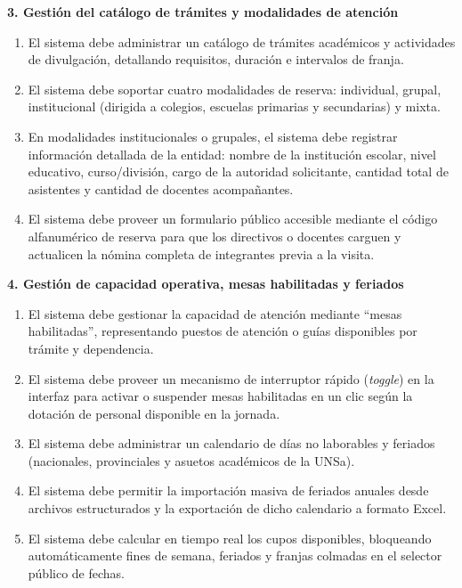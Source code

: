 \textbf{3. Gestión del catálogo de trámites y modalidades de atención}
\begin{enumerate}[resume]
    \item El sistema debe administrar un catálogo de trámites académicos y actividades de divulgación, detallando requisitos, duración e intervalos de franja.
    \item El sistema debe soportar cuatro modalidades de reserva: individual, grupal, institucional (dirigida a colegios, escuelas primarias y secundarias) y mixta.
    \item En modalidades institucionales o grupales, el sistema debe registrar información detallada de la entidad: nombre de la institución escolar, nivel educativo, curso/división, cargo de la autoridad solicitante, cantidad total de asistentes y cantidad de docentes acompañantes.
    \item El sistema debe proveer un formulario público accesible mediante el código alfanumérico de reserva para que los directivos o docentes carguen y actualicen la nómina completa de integrantes previa a la visita.
\end{enumerate}

\textbf{4. Gestión de capacidad operativa, mesas habilitadas y feriados}
\begin{enumerate}[resume]
    \item El sistema debe gestionar la capacidad de atención mediante ``mesas habilitadas'', representando puestos de atención o guías disponibles por trámite y dependencia.
    \item El sistema debe proveer un mecanismo de interruptor rápido (\textit{toggle}) en la interfaz para activar o suspender mesas habilitadas en un clic según la dotación de personal disponible en la jornada.
    \item El sistema debe administrar un calendario de días no laborables y feriados (nacionales, provinciales y asuetos académicos de la UNSa).
    \item El sistema debe permitir la importación masiva de feriados anuales desde archivos estructurados y la exportación de dicho calendario a formato Excel.
    \item El sistema debe calcular en tiempo real los cupos disponibles, bloqueando automáticamente fines de semana, feriados y franjas colmadas en el selector público de fechas.
\end{enumerate}

